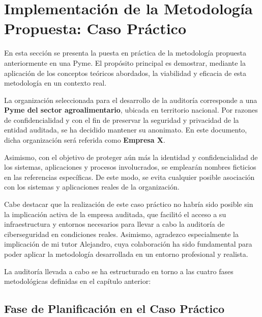 \documentclass[a4paper, 11pt]{article}
\begin{document}
\clearpage
\thispagestyle{nohead}




\section{Implementación de la Metodología Propuesta: Caso Práctico}

En esta sección se presenta la puesta en práctica de la metodología propuesta anteriormente en una Pyme. El propósito principal es demostrar, mediante la aplicación de los conceptos teóricos abordados, la viabilidad y eficacia de esta metodología en un contexto real.



La organización seleccionada para el desarrollo de la auditoría corresponde a una \textbf{Pyme del sector agroalimentario}, ubicada en territorio nacional. Por razones de confidencialidad y con el fin de preservar la seguridad y privacidad de la entidad auditada, se ha decidido mantener su anonimato. En este documento, dicha organización será referida como \textbf{Empresa X}.



Asimismo, con el objetivo de proteger aún más la identidad y confidencialidad de los sistemas, aplicaciones y procesos involucrados, se emplearán nombres ficticios en las referencias específicas. De este modo, se evita cualquier posible asociación con los sistemas y aplicaciones reales de la organización.


Cabe destacar que la realización de este caso práctico no habría sido posible sin la implicación activa de la empresa auditada, que facilitó el acceso a su infraestructura y entornos necesarios para llevar a cabo la auditoría de ciberseguridad en condiciones reales. Asimismo, agradezco especialmente la implicación de mi tutor Alejandro, cuya colaboración ha sido fundamental para poder aplicar la metodología desarrollada en un entorno profesional y realista.



La auditoría llevada a cabo se ha estructurado en torno a las cuatro fases metodológicas definidas en el capítulo anterior:



\subsection{Fase de Planificación en el Caso Práctico}
\end{document}
